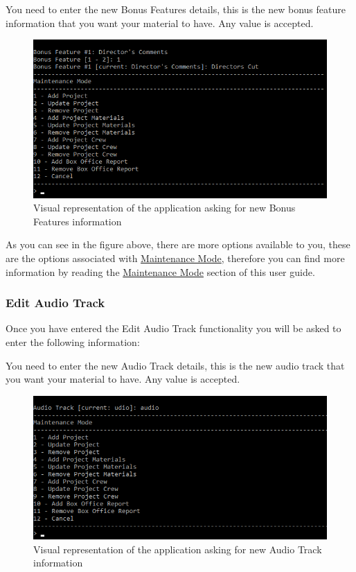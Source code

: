 \documentclass[
  english,
  a4paper,
,tablecaptionabove
]{scrartcl}
\begin{document}
You need to enter the new Bonus Features details, this is the new bonus
feature information that you want your material to have. Any value is
accepted.

\begin{figure}
\centering
\includegraphics{images/user-guide/maintenance-mode/update-project-material-bonus-feature.png}
\caption{Visual representation of the application asking for new Bonus
Features information}
\end{figure}

As you can see in the figure above, there are more options available to
you, these are the options associated with
\protect\hyperlink{using-maintenance-mode}{Maintenance Mode}, therefore
you can find more information by reading the
\protect\hyperlink{using-maintenance-mode}{Maintenance Mode} section of
this user guide.

\newpage

\hypertarget{edit-audio-track}{%
\subsubsection{Edit Audio Track}\label{edit-audio-track}}

Once you have entered the Edit Audio Track functionality you will be
asked to enter the following information:

You need to enter the new Audio Track details, this is the new audio
track that you want your material to have. Any value is accepted.

\begin{figure}
\centering
\includegraphics{images/user-guide/maintenance-mode/update-project-materials-audio-track.png}
\caption{Visual representation of the application asking for new Audio
Track information}
\end{figure}
\end{document}
